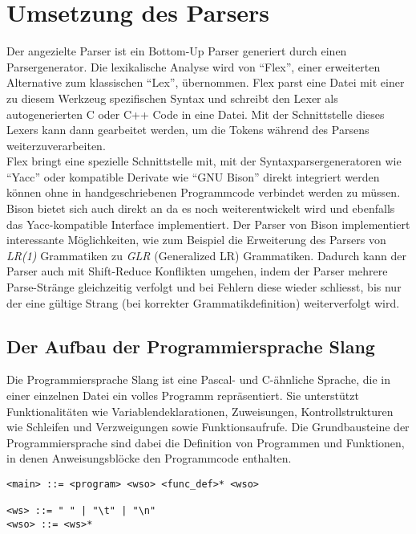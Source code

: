 \chapter{Umsetzung des Parsers}
\label{chap:building:parser}

Der angezielte Parser ist ein Bottom-Up Parser generiert durch einen Parsergenerator.
Die lexikalische Analyse wird von ``Flex'', einer erweiterten Alternative zum klassischen ``Lex'', übernommen.
Flex parst eine Datei mit einer zu diesem Werkzeug spezifischen Syntax und schreibt den Lexer als autogenerierten C oder C++ Code in eine Datei.
Mit der Schnittstelle dieses Lexers kann dann gearbeitet werden, um die Tokens während des Parsens weiterzuverarbeiten.\\
Flex bringt eine spezielle Schnittstelle mit, mit der Syntaxparsergeneratoren wie ``Yacc'' oder kompatible Derivate wie ``GNU Bison'' direkt integriert werden können ohne in handgeschriebenen Programmcode verbindet werden zu müssen\cite{flex:1995}.\\
Bison bietet sich auch direkt an da es noch weiterentwickelt wird und ebenfalls das Yacc-kompatible Interface implementiert.
Der Parser von Bison implementiert interessante Möglichkeiten, wie zum Beispiel die Erweiterung des Parsers von \textit{LR(1)} Grammatiken zu \textit{GLR} (Generalized LR) Grammatiken.
Dadurch kann der Parser auch mit Shift-Reduce Konflikten umgehen, indem der Parser mehrere Parse-Stränge gleichzeitig verfolgt und bei Fehlern diese wieder schliesst, bis nur der eine gültige Strang (bei korrekter Grammatikdefinition) weiterverfolgt wird\cite{bisonmanual}.\\

\section{Der Aufbau der Programmiersprache Slang}

Die Programmiersprache Slang ist eine Pascal- und C-ähnliche Sprache, die in einer einzelnen Datei ein volles Programm repräsentiert.
Sie unterstützt Funktionalitäten wie Variablendeklarationen, Zuweisungen, Kontrollstrukturen wie Schleifen und Verzweigungen sowie Funktionsaufrufe.
Die Grundbausteine der Programmiersprache sind dabei die Definition von Programmen und Funktionen, in denen Anweisungsblöcke den Programmcode enthalten.
\begin{lstlisting}[caption={Grammatikdefinition Einsprungspunkt}]
<main> ::= <program> <wso> <func_def>* <wso>

<ws> ::= " " | "\t" | "\n"
<wso> ::= <ws>*
\end{lstlisting}

